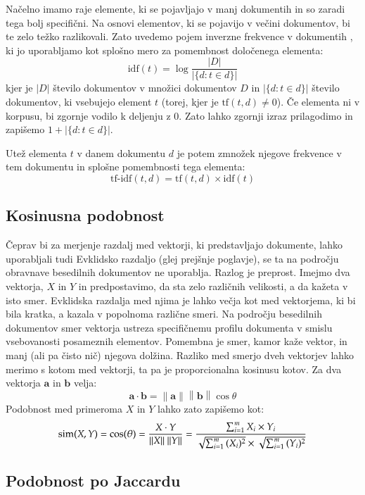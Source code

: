 Načelno imamo raje elemente, ki se pojavljajo v manj dokumentih in so
zaradi tega bolj specifični. Na osnovi elementov, ki se pojavijo v
večini dokumentov, bi te zelo težko razlikovali. Zato uvedemo pojem
inverzne frekvence v dokumentih , ki
jo uporabljamo kot splošno mero za pomembnost določenega elementa:
$$\mathrm{idf}(t) =  \log \frac{|D|}{|\{d: t \in d\}|}$$
kjer je $|D|$ število dokumentov v množici dokumentov $D$ in $|\{d : t
\in d\}|$ število dokumentov, ki vsebujejo element $t$ (torej, kjer je
$\mathrm{tf}(t,d) \neq 0$). Če elementa ni v korpusu, bi zgornje
vodilo k deljenju z 0. Zato lahko zgornji izraz prilagodimo in
zapišemo $1 + |\{d : t \in d\}|$.

Utež elementa $t$ v danem dokumentu $d$ je potem zmnožek njegove
frekvence v tem dokumentu in splošne pomembnosti tega elementa:
$$\mathrm{tf\mbox{-}idf}(t,d) = \mathrm{tf}(t,d) \times \mathrm{idf}(t)$$

\subsection{Kosinusna podobnost}

Čeprav bi za merjenje razdalj med vektorji, ki predstavljajo
dokumente, lahko uporabljali tudi Evklidsko razdaljo (glej prejšnje
poglavje), se ta na področju obravnave besedilnih dokumentov ne
uporablja. Razlog je preprost. Imejmo dva vektorja, $X$ in $Y$ in
predpostavimo, da sta zelo različnih velikosti, a da kažeta v isto
smer. Evklidska razdalja med njima je lahko večja kot med vektorjema,
ki bi bila kratka, a kazala v popolnoma različne smeri. Na področju
besedilnih dokumentov smer vektorja ustreza specifičnemu profilu
dokumenta v smislu vsebovanosti posameznih elementov. Pomembna je
smer, kamor kaže vektor, in manj (ali pa čisto nič) njegova
dolžina. Razliko med smerjo dveh vektorjev lahko merimo s kotom med
vektorji, ta pa je proporcionalna kosinusu kotov. Za dva vektorja
$\mathbf{a}$ in $\mathbf{b}$ velja:
$$\mathbf{a}\cdot\mathbf{b}
=\left\|\mathbf{a}\right\|\left\|\mathbf{b}\right\|\cos\theta$$
Podobnost med primeroma $X$ in $Y$ lahko zato zapišemo kot:
$$\text{sim}(X,Y) = \cos(\theta) = {X \cdot Y \over \|X\|\ \|Y\|}
= \frac{ \sum_{i=1}^{m}{X_i \times Y_i} }{
  \sqrt{\sum_{i=1}^{m}{(X_i)^2}} \times \sqrt{\sum_{i=1}^{m}{(Y_i)^2}}
}$$

\subsection{Podobnost po Jaccardu}

